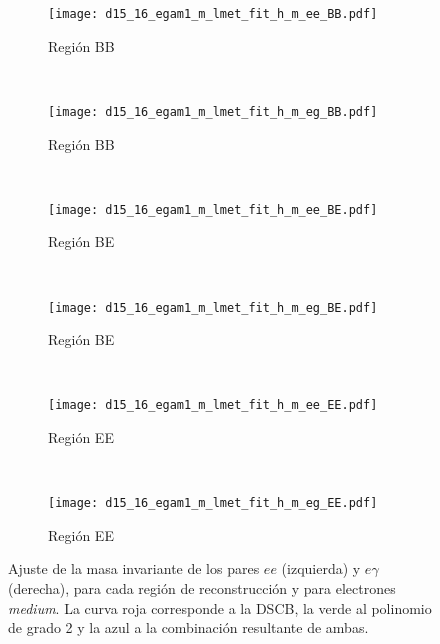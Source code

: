 \begin{figure}

	\begin{subfigure}{0.5\textwidth}
		\texttt{[image: d15\_16\_egam1\_m\_lmet\_fit\_h\_m\_ee\_BB.pdf]} 
		\caption{Región BB}
	\end{subfigure}
	~
	\begin{subfigure}{0.5\textwidth}
		\texttt{[image: d15\_16\_egam1\_m\_lmet\_fit\_h\_m\_eg\_BB.pdf]}
		\caption{Región BB}
	\end{subfigure}
	~
	\begin{subfigure}{0.5\textwidth}
		\texttt{[image: d15\_16\_egam1\_m\_lmet\_fit\_h\_m\_ee\_BE.pdf]} 
		\caption{Región BE}
	\end{subfigure}
	~
	\begin{subfigure}{0.5\textwidth}
		\texttt{[image: d15\_16\_egam1\_m\_lmet\_fit\_h\_m\_eg\_BE.pdf]}
		\caption{Región BE}
	\end{subfigure}
	~
	\begin{subfigure}{0.5\textwidth}
		\texttt{[image: d15\_16\_egam1\_m\_lmet\_fit\_h\_m\_ee\_EE.pdf]} 
		\caption{Región EE}
	\end{subfigure}
	~
	\begin{subfigure}{0.5\textwidth}
		\texttt{[image: d15\_16\_egam1\_m\_lmet\_fit\_h\_m\_eg\_EE.pdf]}
		\caption{Región EE}
	\end{subfigure}

	\caption{Ajuste de la masa invariante de los pares $ee$ (izquierda) y $e\gamma$ (derecha), para cada región de reconstrucción y para electrones \textit{medium}. La curva roja corresponde a la DSCB, la verde al polinomio de grado 2 y la azul a la combinación resultante de ambas.}
\label{fits_invmass_medium}
\end{figure}

